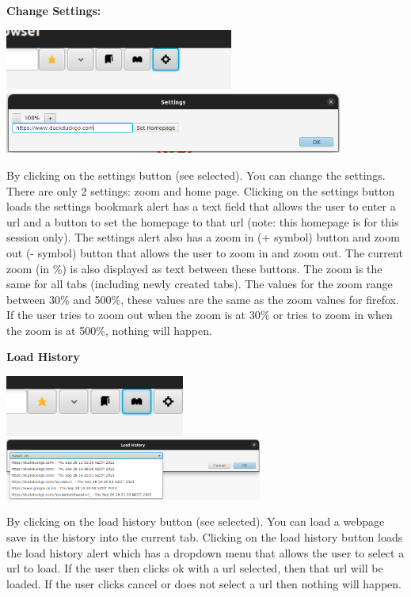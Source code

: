 \documentclass[10pt,a4paper]{report}
\begin{document}
	 
	 \LARGE \noindent \justifying \textbf{Change Settings:} \par
	 \noindent \includegraphics[height=20mm]{images/settings.png}
	 \noindent \includegraphics[height=20mm]{images/settingsAlert.png} \par
	 \normalsize \noindent By clicking on the settings button (see selected). You can change the settings. There are only 2 settings: zoom and home page. Clicking on the settings button loads the settings bookmark alert has  a text field that allows the user to enter a url and a button to set the homepage to that url (note: this homepage is for this session only). The settings alert also has a zoom in (+ symbol) button and zoom out (- symbol) button that allows the user to zoom in and zoom out. The current zoom (in \%) is also displayed as text between these buttons. The zoom is the same for all tabs (including newly created tabs). The values for the zoom range between 30\% and 500\%, these values are the same as the zoom values for firefox. If the user tries to zoom out when the zoom is at 30\% or tries to zoom in when the zoom is at 500\%, nothing will happen. \par
	 
	 
	 \LARGE \noindent \justifying \textbf{Load History} \par
	 \noindent \includegraphics[height=20mm]{images/history.png}
	 \noindent \includegraphics[height=20mm]{images/historyAlert.png} \par
	 \normalsize \noindent By clicking on the load history button (see selected). You can load a webpage save in the history into the current tab. Clicking on the load history button loads the load history alert which has a dropdown menu that allows the user to select a url to load. If the user then clicks ok with a url selected, then that url will be loaded. If the user clicks cancel or does not select a url then nothing will happen. \par
	 
\end{document}
